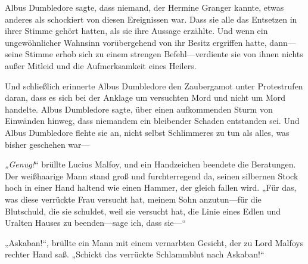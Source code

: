 Albus Dumbledore sagte, dass niemand, der Hermine Granger kannte, etwas anderes als schockiert von diesen Ereignissen war. Dass sie alle das Entsetzen in ihrer Stimme gehört hatten, als sie ihre Aussage erzählte. Und wenn ein ungewöhnlicher Wahnsinn vorübergehend von ihr Besitz ergriffen hatte, dann—seine Stimme erhob sich zu einem strengen Befehl—verdiente sie von ihnen nichts außer Mitleid und die Aufmerksamkeit eines Heilers.

Und schließlich erinnerte Albus Dumbledore den Zaubergamot unter Protestrufen daran, dass es sich bei der Anklage um versuchten Mord und nicht um Mord handelte. Albus Dumbledore sagte, über einen aufkommenden Sturm von Einwänden hinweg, dass niemandem ein bleibender Schaden entstanden sei. Und Albus Dumbledore flehte sie an, nicht selbst Schlimmeres zu tun als alles, was bisher geschehen war—

\emph{„Genug!}“ brüllte Lucius Malfoy, und ein Handzeichen beendete die Beratungen. Der weißhaarige Mann stand groß und furchterregend da, seinen silbernen Stock hoch in einer Hand haltend wie einen Hammer, der gleich fallen wird. „Für das, was diese verrückte Frau versucht hat, meinem Sohn anzutun—für die Blutschuld, die sie schuldet, weil sie versucht hat, die Linie eines Edlen und Uralten Hauses zu beenden—sage ich, dass sie—“

„Askaban!“, brüllte ein Mann mit einem vernarbten Gesicht, der zu Lord Malfoys rechter Hand saß. „Schickt das verrückte Schlammblut nach Askaban!“

